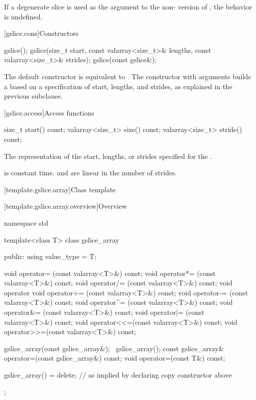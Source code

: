 \pnum
If a degenerate slice is used as the argument to the
non-
version of
,
the behavior is undefined.
%

[gslice.cons]{Constructors}

%
\begin{itemdecl}
gslice();
gslice(size_t start, const valarray<size_t>& lengths,
         const valarray<size_t>& strides);
gslice(const gslice&);
\end{itemdecl}

\begin{itemdescr}
\pnum
The default constructor is equivalent to
.
The constructor with arguments builds a
based on a specification of start, lengths, and strides, as explained
in the previous subclause.
\end{itemdescr}

[gslice.access]{Access functions}

%
%
%
\begin{itemdecl}
size_t           start()  const;
valarray<size_t> size() const;
valarray<size_t> stride() const;
\end{itemdecl}

\begin{itemdescr}
\pnum
\returns
The representation of the
start, lengths, or strides specified for the .

\pnum
\complexity
{} is constant time.  and 
are linear in the number of strides.
\end{itemdescr}

[template.gslice.array]{Class template }

[template.gslice.array.overview]{Overview}

%
%
\begin{codeblock}
namespace std {
  template<class T> class gslice_array {
  public:
    using value_type = T;

    void operator=  (const valarray<T>&) const;
    void operator*= (const valarray<T>&) const;
    void operator/= (const valarray<T>&) const;
    void operator%
    void operator+= (const valarray<T>&) const;
    void operator-= (const valarray<T>&) const;
    void operator^= (const valarray<T>&) const;
    void operator&= (const valarray<T>&) const;
    void operator|= (const valarray<T>&) const;
    void operator<<=(const valarray<T>&) const;
    void operator>>=(const valarray<T>&) const;

    gslice_array(const gslice_array&);
    ~gslice_array();
    const gslice_array& operator=(const gslice_array&) const;
    void operator=(const T&) const;

    gslice_array() = delete;    // as implied by declaring copy constructor above
  };
}
\end{codeblock}

